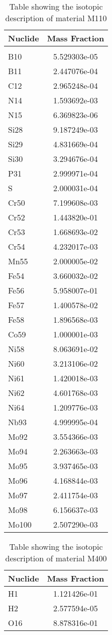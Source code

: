 \begin{centering}
\begin{table}[ht!]
\begin{tabular}{l | c}
\hline
Nuclide & Mass Fraction\\
\hline
\\
B10 & 5.529303e-05\\
B11 & 2.447076e-04\\
C12 & 2.965248e-04\\
N14 & 1.593692e-03\\
N15 & 6.369823e-06\\
Si28 & 9.187249e-03\\
Si29 & 4.831669e-04\\
Si30 & 3.294676e-04\\
P31 & 2.999971e-04\\
S & 2.000031e-04\\
Cr50 & 7.199608e-03\\
Cr52 & 1.443820e-01\\
Cr53 & 1.668693e-02\\
Cr54 & 4.232017e-03\\
Mn55 & 2.000005e-02\\
Fe54 & 3.660032e-02\\
Fe56 & 5.958007e-01\\
Fe57 & 1.400578e-02\\
Fe58 & 1.896568e-03\\
Co59 & 1.000001e-03\\
Ni58 & 8.063691e-02\\
Ni60 & 3.213106e-02\\
Ni61 & 1.420018e-03\\
Ni62 & 4.601768e-03\\
Ni64 & 1.209776e-03\\
Nb93 & 4.999995e-04\\
Mo92 & 3.554366e-03\\
Mo94 & 2.263663e-03\\
Mo95 & 3.937465e-03\\
Mo96 & 4.168844e-03\\
Mo97 & 2.411754e-03\\
Mo98 & 6.156637e-03\\
Mo100 & 2.507290e-03
\end{tabular}
\caption{Table showing the isotopic description of material M110}
\label{table:material_M110}
\end{table}\clearpage

\begin{table}[ht!]
\begin{tabular}{l | c}
\hline
Nuclide & Mass Fraction\\
\hline
H1 & 1.121426e-01\\
H2 & 2.577594e-05\\
O16 & 8.878316e-01
\end{tabular}
\caption{Table showing the isotopic description of material M400}
\label{table:material_M400}
\end{table}\clearpage


\end{centering}
